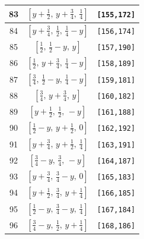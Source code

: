 \documentclass[fleqn,8pt]{jsarticle}
\begin{document}
\begin{longtable}{ccc}
83 & $\left[ y + \frac{1}{2},\, y + \frac{3}{4},\, \frac{1}{4} \right]$ & {\tt [155,172]} \\ \hline
84 & $\left[ y + \frac{3}{4},\, \frac{1}{2},\, \frac{1}{4} - y \right]$ & {\tt [156,174]} \\ \hline
85 & $\left[ \frac{1}{2},\, \frac{1}{2} - y,\, y \right]$ & {\tt [157,190]} \\ \hline
86 & $\left[ \frac{1}{2},\, y + \frac{3}{4},\, \frac{1}{4} - y \right]$ & {\tt [158,189]} \\ \hline
87 & $\left[ \frac{3}{4},\, \frac{1}{2} - y,\, \frac{1}{4} - y \right]$ & {\tt [159,181]} \\ \hline
88 & $\left[ \frac{3}{4},\, y + \frac{3}{4},\, y \right]$ & {\tt [160,182]} \\ \hline
89 & $\left[ y + \frac{1}{2},\, \frac{1}{2},\, - y \right]$ & {\tt [161,188]} \\ \hline
90 & $\left[ \frac{1}{2} - y,\, y + \frac{1}{2},\, 0 \right]$ & {\tt [162,192]} \\ \hline
91 & $\left[ y + \frac{3}{4},\, y + \frac{1}{2},\, \frac{1}{4} \right]$ & {\tt [163,191]} \\ \hline
92 & $\left[ \frac{3}{4} - y,\, \frac{3}{4},\, - y \right]$ & {\tt [164,187]} \\ \hline
93 & $\left[ y + \frac{3}{4},\, \frac{3}{4} - y,\, 0 \right]$ & {\tt [165,183]} \\ \hline
94 & $\left[ y + \frac{1}{2},\, \frac{3}{4},\, y + \frac{1}{4} \right]$ & {\tt [166,185]} \\ \hline
95 & $\left[ \frac{1}{2} - y,\, \frac{3}{4} - y,\, \frac{1}{4} \right]$ & {\tt [167,184]} \\ \hline
96 & $\left[ \frac{3}{4} - y,\, \frac{1}{2},\, y + \frac{1}{4} \right]$ & {\tt [168,186]} \\
\end{longtable}
\renewcommand{\arraystretch}{1.2}
\end{document}
